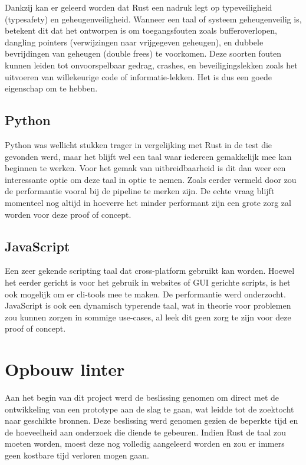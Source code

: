 Dankzij \textcite{Klabnik2022} kan er geleerd worden dat Rust een nadruk legt op typeveiligheid (typesafety) en geheugenveiligheid. Wanneer een taal of systeem geheugenveilig is, betekent dit dat het ontworpen is om toegangsfouten zoals bufferoverlopen, dangling pointers (verwijzingen naar vrijgegeven geheugen), en dubbele bevrijdingen van geheugen (double frees) te voorkomen. Deze soorten fouten kunnen leiden tot onvoorspelbaar gedrag, crashes, en beveiligingslekken zoals het uitvoeren van willekeurige code of informatie-lekken. Het is dus een goede eigenschap om te hebben.

\subsection{Python}
Python was wellicht stukken trager in vergelijking met Rust in de test die gevonden werd, maar het blijft wel een taal waar iedereen gemakkelijk mee kan beginnen te werken. Voor het gemak van uitbreidbaarheid is dit dan weer een interessante optie om deze taal in optie te nemen. Zoals eerder vermeld door \textcite{TurnerTrauring2023} zou de performantie vooral bij de pipeline te merken zijn.
De echte vraag blijft momenteel nog altijd in hoeverre het minder performant zijn een grote zorg zal worden voor deze proof of concept.

\subsection{JavaScript}
Een zeer gekende scripting taal dat cross-platform gebruikt kan worden. Hoewel het eerder gericht is voor het gebruik in websites of GUI gerichte scripts, is het ook mogelijk om er cli-tools mee te maken. De performantie werd onderzocht. JavaScript is ook een dynamisch typerende taal, wat in theorie voor problemen zou kunnen zorgen in sommige use-cases, al leek dit geen zorg te zijn voor deze proof of concept\autocite{Simpson2023}.

\section{Opbouw linter}
Aan het begin van dit project werd de beslissing genomen om direct met de ontwikkeling van een prototype aan de slag te gaan, wat leidde tot de zoektocht naar geschikte bronnen. Deze beslissing werd genomen gezien de beperkte tijd en de hoeveelheid aan onderzoek die diende te gebeuren. Indien Rust de taal zou moeten worden, moest deze nog volledig aangeleerd worden en zou er immers geen kostbare tijd verloren mogen gaan.

